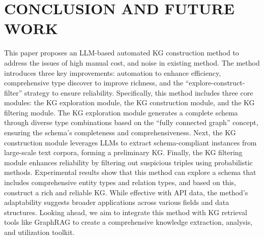 \section{CONCLUSION AND FUTURE WORK}
This paper proposes an LLM-based automated KG construction method to address the issues of high manual cost, and noise in existing method.
The method introduces three key improvements: automation to enhance efficiency, comprehensive type discover to improve richness, and the ``explore-construct-filter'' strategy to ensure reliability.
Specifically, this method includes three core modules: the KG exploration module, the KG construction module, and the KG filtering module.
The KG exploration module generates a complete schema through diverse type combinations based on the ``fully connected graph'' concept, ensuring the schema's completeness and comprehensiveness.
Next, the KG construction module leverages LLMs to extract schema-compliant instances from large-scale text corpora, forming a preliminary KG. Finally, the KG filtering module enhances reliability by filtering out suspicious triples using probabilistic methods.
Experimental results show that this method can explore a schema that includes comprehensive entity types and relation types, and based on this, construct a rich and reliable KG.
While effective with API data, the method's adaptability suggests broader applications across various fields and data structures.
Looking ahead, we aim to integrate this method with KG retrieval tools like GraphRAG to create a comprehensive knowledge extraction, analysis, and utilization toolkit.

